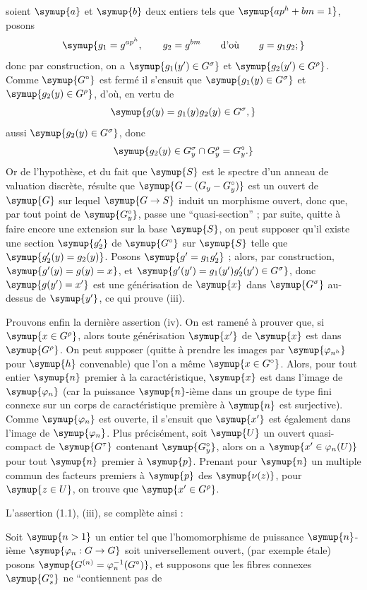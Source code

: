 soient $\symup{a}$ et $\symup{b}$ deux entiers tels que $\symup{ap^h+bm=1}$, posons
\[
\symup{g_1=g^{ap^h},\qquad g_2=g^{bm}\qquad\text{d'où}\qquad g=g_1g_2 ;}
\]
donc par construction, on a $\symup{g_1(y')\in G^\sigma}$ et
$\symup{g_2(y')\in G^\rho}$. Comme $\symup{G^\circ}$ est fermé il s'ensuit que
$\symup{g_1(y)\in G^\sigma}$ et $\symup{g_2(y)\in G^\rho}$, d'où, en vertu de
\[
\symup{g(y)=g_1(y)g_2(y)\in G^\sigma,}
\]
aussi $\symup{g_2(y)\in G^\sigma}$, donc
\[
\symup{g_2(y)\in G_y^\sigma\cap G_y^\rho=G_y^\circ.}
\]
Or de l'hypothèse, et du fait que $\symup{S}$ est le spectre d'un anneau de valuation
discrète, résulte que $\symup{G-(G_y-G_y^\circ)}$ est un ouvert de $\symup{G}$ sur lequel
$\symup{G\to  S}$ induit un morphisme ouvert, donc que, par tout point de
$\symup{G_y^\circ}$, passe une ``quasi-section'' ; par suite, quitte à faire encore une
extension sur la base $\symup{S}$, on peut supposer qu'il existe une section $\symup{g'_2}$ de
$\symup{G^\circ}$ sur $\symup{S}$ telle que $\symup{g'_2(y)=g_2(y)}$. Posons $\symup{g'=g_1g'_2}$ ; alors, par
construction, $\symup{g'(y)=g(y)=x}$, et
$\symup{g'(y')=g_1(y')g'_2(y')\in G^\sigma}$, donc $\symup{g(y')=x'}$ est une générisation de $\symup{x}$ dans $\symup{G^\sigma}$ au-dessus de
$\symup{y'}$, ce qui prouve (iii).

Prouvons enfin la dernière assertion (iv). On est ramené à prouver que, si
$\symup{x\in G^\rho}$, alors toute générisation $\symup{x'}$ de $\symup{x}$ est dans $\symup{G^\rho}$. On peut
supposer (quitte à prendre les images par $\symup{\varphi_{n^h}}$ pour $\symup{h}$
convenable) que l'on a même
$\symup{x\in G^\circ}$. Alors, pour tout entier $\symup{n}$ premier à la caractéristique, $\symup{x}$
est dans l'image de $\symup{\varphi_n}$ (car la puissance $\symup{n}$-ième dans un groupe de
type fini connexe sur un corps de caractéristique première à $\symup{n}$ est
surjective). Comme $\symup{\varphi_n}$ est ouverte, il s'ensuit que $\symup{x'}$ est également
dans l'image de $\symup{\varphi_n}$. Plus précisément, soit $\symup{U}$ un ouvert
quasi-compact de $\symup{G^\tau}$ contenant $\symup{G_y^\circ}$, alors on a
$\symup{x'\in\varphi_n(U)}$ pour tout $\symup{n}$ premier à $\symup{p}$. Prenant pour $\symup{n}$ un multiple
commun des facteurs premiers à $\symup{p}$ des $\symup{\nu(z)}$, pour $\symup{z\in U}$, on trouve que
$\symup{x'\in G^\rho}$.

L'assertion (1.1), (iii), se complète ainsi :

 Soit $\symup{n>1}$ un entier tel que l'homomorphisme de
puissance $\symup{n}$-ième $\symup{\varphi_n:G\to  G}$ soit universellement ouvert,
(par exemple étale) posons
$\symup{G^{(n)}=\varphi_n^{-1}(G^\circ)}$, et supposons que les fibres connexes $\symup{G_s^\circ}$ ne ``contiennent pas de

